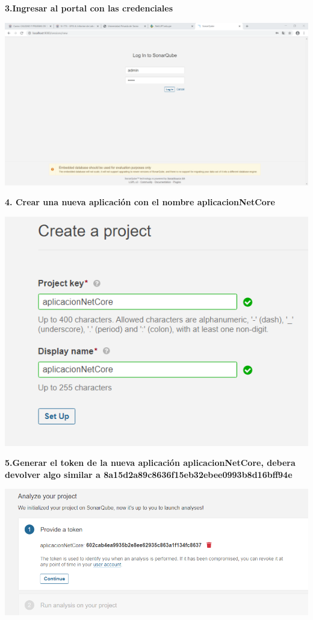 \documentclass{article}
\begin{document}
  \newpage
\textbf{3.Ingresar al portal con las credenciales}

    \begin{center}
		\includegraphics[width=15cm]{./images/3} 
	\end{center}
\newpage
\textbf{4. Crear una nueva aplicación con el nombre aplicacionNetCore}

    \begin{center}
		\includegraphics[width=15cm]{./images/4} 
	\end{center}
	
\newpage

\textbf{5.Generar el token de la nueva aplicación aplicacionNetCore, debera devolver algo similar a 8a15d2a89c8636f15eb32ebee0993b8d16bff94e}

    \begin{center}
		\includegraphics[width=15cm]{./images/5} 
	\end{center}
	
\end{document}
